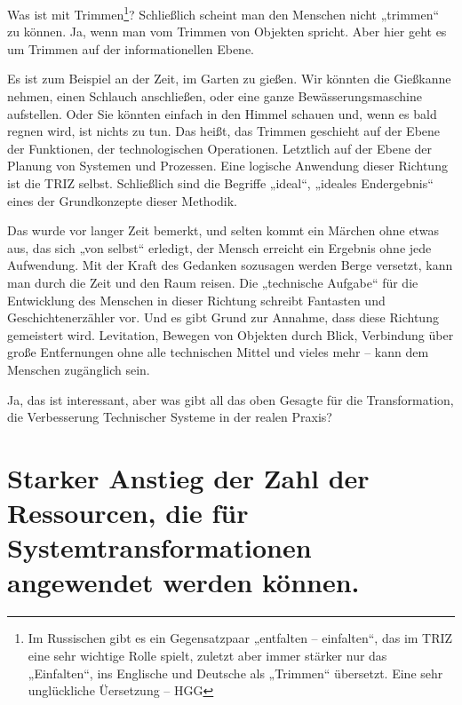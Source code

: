\documentclass[11pt,a4paper]{article}
\begin{document}
Was ist mit Trimmen\footnote{Im Russischen gibt es ein Gegensatzpaar
  „entfalten -- einfalten“, das im TRIZ eine sehr wichtige Rolle spielt,
  zuletzt aber immer stärker nur das „Einfalten“, ins Englische und Deutsche
  als „Trimmen“ übersetzt.  Eine sehr unglückliche Üersetzung -- HGG}?
Schließlich scheint man den Menschen nicht „trimmen“ zu können. Ja, wenn man
vom Trimmen von Objekten spricht. Aber hier geht es um Trimmen auf der
informationellen Ebene.

Es ist zum Beispiel an der Zeit, im Garten zu gießen. Wir könnten die
Gießkanne nehmen, einen Schlauch anschließen, oder eine ganze
Bewässerungsmaschine aufstellen. Oder Sie könnten einfach in den Himmel
schauen und, wenn es bald regnen wird, ist nichts zu tun. Das heißt, das
Trimmen geschieht auf der Ebene der Funktionen, der technologischen
Operationen. Letztlich auf der Ebene der Planung von Systemen und Prozessen.
Eine logische Anwendung dieser Richtung ist die TRIZ selbst. Schließlich sind
die Begriffe „ideal“, „ideales Endergebnis“ eines der Grundkonzepte dieser
Methodik.

Das wurde vor langer Zeit bemerkt, und selten kommt ein Märchen ohne etwas
aus, das sich „von selbst“ erledigt, der Mensch erreicht ein Ergebnis ohne
jede Aufwendung.  Mit der Kraft des Gedanken sozusagen werden Berge versetzt,
kann man durch die Zeit und den Raum reisen.  Die „technische Aufgabe“ für die
Entwicklung des Menschen in dieser Richtung schreibt Fantasten und
Geschichtenerzähler vor. Und es gibt Grund zur Annahme, dass diese Richtung
gemeistert wird. Levitation, Bewegen von Objekten durch Blick, Verbindung über
große Entfernungen ohne alle technischen Mittel und vieles mehr -- kann dem
Menschen zugänglich sein.

Ja, das ist interessant, aber was gibt all das oben Gesagte für die
Transformation, die Verbesserung Technischer Systeme in der realen Praxis?

\section*{Starker Anstieg der Zahl der Ressourcen, die für
  Systemtransformationen angewendet werden können.} 
\end{document}
